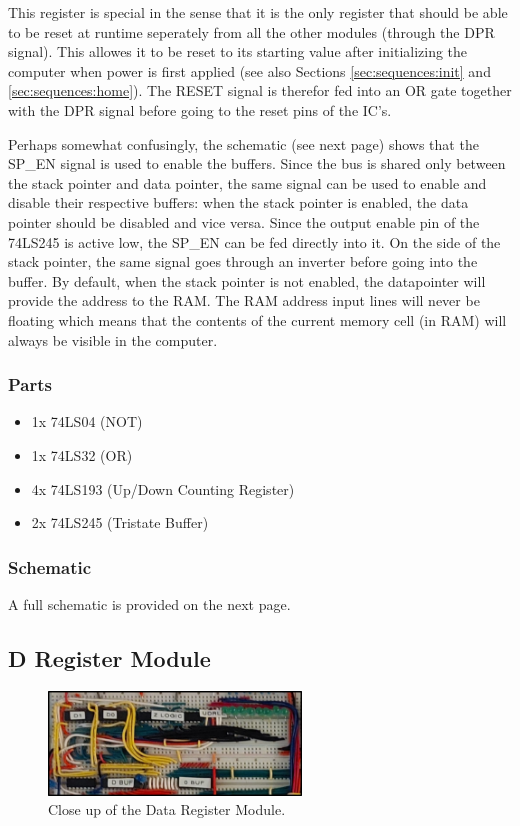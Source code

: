 This register is special in the sense that it is the only register that should be able to be reset at runtime seperately from all the other modules (through the DPR signal). This allowes it to be reset to its starting value after initializing the computer when power is first applied (see also Sections \ref{sec:sequences:init} and \ref{sec:sequences:home}). The RESET signal is therefor fed into an OR gate together with the DPR signal before going to the reset pins of the IC's.

Perhaps somewhat confusingly, the schematic (see next page) shows that the SP\_EN signal is used to enable the buffers. Since the bus is shared only between the stack pointer and data pointer, the same signal can be used to enable and disable their respective buffers: when the stack pointer is enabled, the data pointer should be disabled and vice versa. Since the output enable pin of the 74LS245 is active low, the SP\_EN can be fed directly into it. On the side of the stack pointer, the same signal goes through an inverter before going into the buffer. By default, when the stack pointer is not enabled, the datapointer will provide the address to the RAM. The RAM address input lines will never be floating which means that the contents of the current memory cell (in RAM) will always be visible in the computer.

\subsubsection*{Parts}
\begin{itemize}\itemsep0em
\item 1x 74LS04 (NOT)
\item 1x 74LS32 (OR)
\item 4x 74LS193 (Up/Down Counting Register)
\item 2x 74LS245 (Tristate Buffer)
\end{itemize}


\subsubsection*{Schematic}
A full schematic is provided on the next page.




\subsection{D Register Module}
\begin{figure}[H]
  \centering
  \includegraphics[width=0.6\textwidth]{img/dregcloseup}
  \caption{Close up of the Data Register Module.}
  \label{fig:dregcloseup}
\end{figure}

